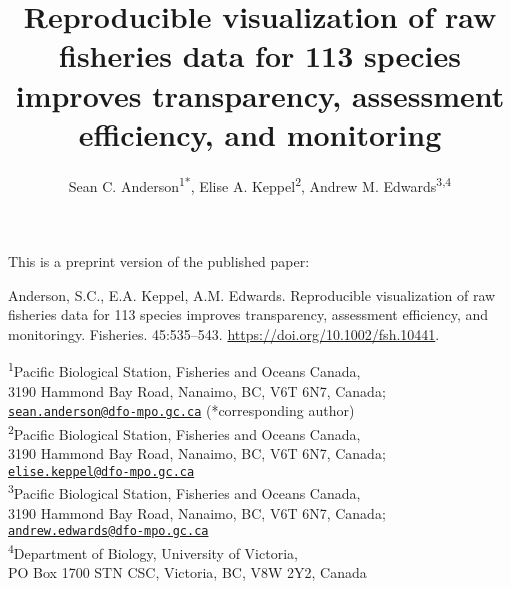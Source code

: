 \documentclass[12pt,]{article}
\title{Reproducible visualization of raw fisheries data for 113 species improves transparency, assessment efficiency, and monitoring}
\begin{document}
\begin{large}
{\color{LightSteelBlue4}
This is a preprint version of the published paper:

Anderson, S.C., E.A. Keppel, A.M. Edwards.
Reproducible visualization of raw fisheries data for
113 species improves transparency, assessment efficiency, and monitoringy.
Fisheries. 45:535--543. \url{https://doi.org/10.1002/fsh.10441}.
}
\end{large}

\date{}
\author{Sean C. Anderson\textsuperscript{1*}, Elise A. Keppel\textsuperscript{2}, Andrew M. Edwards\textsuperscript{3,4}}

{\let\newpage\relax\maketitle}

\begin{center}
\textsuperscript{1}Pacific Biological Station, Fisheries and Oceans Canada,\\
3190 Hammond Bay Road, Nanaimo, BC, V6T 6N7, Canada;\\
\href{mailto:sean.anderson@dfo-mpo.gc.ca}{\nolinkurl{sean.anderson@dfo-mpo.gc.ca}} (*corresponding author)\\
\textsuperscript{2}Pacific Biological Station, Fisheries and Oceans Canada,\\
3190 Hammond Bay Road, Nanaimo, BC, V6T 6N7, Canada;\\
\href{mailto:elise.keppel@dfo-mpo.gc.ca}{\nolinkurl{elise.keppel@dfo-mpo.gc.ca}}\\
\textsuperscript{3}Pacific Biological Station, Fisheries and Oceans Canada,\\
3190 Hammond Bay Road, Nanaimo, BC, V6T 6N7, Canada;\\
\href{mailto:andrew.edwards@dfo-mpo.gc.ca}{\nolinkurl{andrew.edwards@dfo-mpo.gc.ca}}\\
\textsuperscript{4}Department of Biology, University of Victoria,\\
PO Box 1700 STN CSC, Victoria, BC, V8W 2Y2, Canada
\end{center}

\setlength{\parindent}{0em}
\setlength{\parskip}{0.65em}


\end{document}

